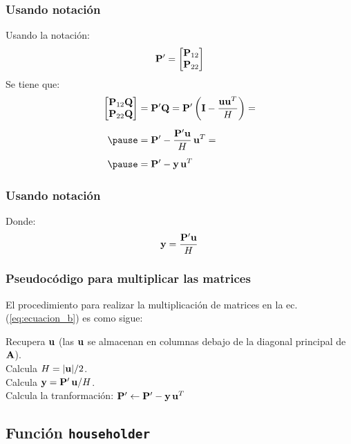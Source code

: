 \documentclass[12pt]{beamer}
\begin{document}
\begin{frame}
\frametitle{Usando notación}
Usando la notación:
\pause
\renewcommand{\arraystretch}{1}
\begin{align*}
{\vb{P}}^{\prime} =
\begin{bmatrix}
\vb{P}_{12} \\
\vb{P}_{22}
\end{bmatrix}
\end{align*}
\pause
Se tiene que:
\pause
\begin{eqnarray}
\begin{aligned}[b]
\begin{bmatrix}
\vb{P}_{12} \vb{Q}\\
\vb{P}_{22} \vb{Q}
\end{bmatrix}
&= \pderivada{\vb{P}} \vb{Q} = \pderivada{\vb{P}} \left( \vb{I} - \dfrac{\vb{u} \vb{u}^{T}}{H} \right) = \\[0.5em] \pause
&= \pderivada{\vb{P}} - \dfrac{\pderivada{\vb{P}} \vb{u}}{H} \, \vb{u}^{T} = \\[0.5em] \pause
&= \pderivada{\vb{P}} - \vb{y} \, \vb{u}^{T}
\end{aligned}
\label{eq:ecuacion_09_47}
\end{eqnarray}
\end{frame}
\begin{frame}
\frametitle{Usando notación}
Donde:
\pause
\begin{align}
\vb{y} = \dfrac{{\vb{P}}^{\prime} \vb{u}}{H}
\label{eq:ecuacion_09_48}
\end{align}
\end{frame}
\begin{frame}
\frametitle{Pseudocódigo para multiplicar las matrices}
El procedimiento para realizar la multiplicación de matrices en la ec. (\ref{eq:ecuacion_b}) es como sigue:
\pause
\begin{tcolorbox}[colback=platinum, title=Procedimiento para la multiplicación de matrices]
Recupera $\vb{u}$ (las $\vb{u}$ se almacenan en columnas debajo de la diagonal principal de $\vb{A}$). \\ \pause
Calcula $H = \abs{\vb{u}} / 2$. \\ \pause
Calcula $\vb{y} = {\vb{P}}^{\prime} \, \vb{u} / H$. \\ \pause
Calcula la tranformación: ${\vb{P}}^{\prime} \leftarrow {\vb{P}}^{\prime} - \vb{y} \, \vb{u}^{T}$
\end{tcolorbox}
\end{frame}

\subsection{Función \texttt{householder}}
\end{document}
